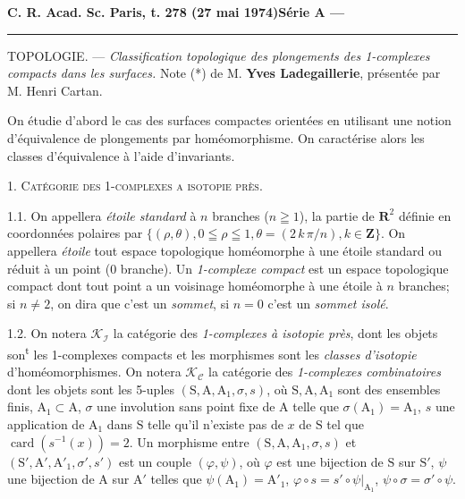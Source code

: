 \textbf{C. R. Acad. Sc. Paris, t. 278 (27 mai 1974)}\hfill\textbf{Série A ---}\par\noindent\rule{\linewidth}{.35pt}\par

TOPOLOGIE. --- \textit{Classification topologique des plongements des 1-complexes compacts dans les surfaces.} Note (*) de M. \textbf{Yves Ladegaillerie}, présentée par M. Henri Cartan.

{\small On étudie d'abord le cas des surfaces compactes orientées en utilisant une notion d'équivalence de plongements par homéomorphisme. On caractérise alors les classes d'équivalence à l'aide d'invariants.}

1. \textsc{Catégorie des 1-complexes a isotopie près.}

1.1. On appellera \textit{étoile standard} à \(n\) branches (\(n\geqq1\)), la partie de \(\mathbf{R}^2\) définie en coordonnées polaires par \(\{(\rho,\theta),0\leqq\rho\leqq1,\theta=(2\,k\,\pi/n), k\in\mathbf{Z}\}\). On appellera \textit{étoile} tout espace topologique homéomorphe à une étoile standard ou réduit à un point (0 branche). Un \textit{1-complexe compact} est un espace topologique compact dont tout point a un voisinage homéomorphe à une étoile à \(n\) branches; si \(n\ne2\), on dira que c'est un \textit{sommet}, si \(n=0\) c'est un \textit{sommet isolé}.

1.2. On notera \(\mathscr{K}_{\mathscr I}\) la catégorie des \textit{1-complexes à isotopie près}, dont les objets son\textsuperscript{t} les 1-complexes compacts et les morphismes sont les \textit{classes d'isotopie} d'homéomorphismes. On notera \(\mathscr{K}_{\mathscr C}\) la catégorie des \textit{1-complexes combinatoires} dont les objets sont les 5-uples \((\mathrm{S},\mathrm{A},\mathrm{A}_1,\sigma,s)\), où \(\mathrm{S},\mathrm{A},\mathrm{A}_1\) sont des ensembles finis, \(\mathrm{A}_1\subset\mathrm{A}\), \(\sigma\) une involution sans point fixe de \(\mathrm{A}\) telle que \(\sigma(\mathrm{A}_1)=\mathrm{A}_1\), \(s\) une application de \(\mathrm{A}_1\) dans \(\mathrm{S}\) telle qu'il n'existe pas de \(x\) de \(\mathrm{S}\) tel que \(\operatorname{card}(s^{-1}(x))=2\). Un morphisme entre \((\mathrm{S},\mathrm{A},\mathrm{A}_1,\sigma,s)\) et \((\mathrm{S}',\mathrm{A}',\mathrm{A}'_1,\sigma',s')\) est un couple \((\varphi,\psi)\), où \(\varphi\) est une bijection de \(\mathrm{S}\) sur \(\mathrm{S}'\), \(\psi\) une bijection de \(\mathrm{A}\) sur \(\mathrm{A}'\) telles que \(\psi(\mathrm{A}_1)=\mathrm{A}'_1\), \(\varphi\circ s=s'\circ\psi\vert_{\mathrm{A}_1}\), \(\psi\circ\sigma=\sigma'\circ\psi\).

